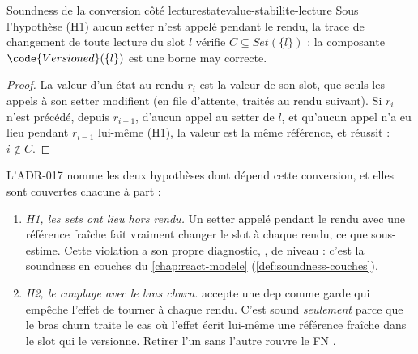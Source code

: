 \begin{proposition}{Soundness de la conversion côté lecture}{statevalue-stabilite-lecture}
  Sous l'hypothèse (H1) \og aucun setter n'est appelé pendant le rendu\fg{},
  la trace de changement de toute lecture du slot $l$ vérifie $C \subseteq
  \mathit{Set}(\{l\})$ : la composante $\code{Versioned}(\{l\})$ est une
  borne may correcte.
\end{proposition}
\begin{proof}
  La valeur d'un état au rendu $r_i$ est la valeur de son slot, que seuls
  les appels à son setter modifient (en file d'attente, traités au rendu
  suivant). Si $r_i$ n'est précédé, depuis $r_{i-1}$, d'aucun appel au setter
  de $l$, et qu'aucun appel n'a eu lieu pendant $r_{i-1}$ lui-même (H1), la
  valeur est la même référence, et  réussit : $i \notin C$.
\end{proof}

L'ADR-017 nomme les deux hypothèses dont dépend cette conversion, et elles
sont couvertes chacune à part :
\begin{enumerate}
  \item \emph{H1, les sets ont lieu hors rendu.} Un setter appelé pendant le
    rendu avec une référence fraîche fait vraiment changer le slot à chaque
    rendu, ce que  sous-estime. Cette violation a son propre
    diagnostic, , de niveau \Error{} : c'est la
    soundness en couches du \cref{chap:react-modele}
    (\cref{def:soundness-couches}).
  \item \emph{H2, le couplage avec le bras churn.} 
    accepte une dep  comme \og garde\fg{} qui empêche
    l'effet de tourner à chaque rendu. C'est sound \emph{seulement} parce
    que le bras churn traite le cas où l'effet écrit lui-même une référence
    fraîche dans le slot qui le versionne. Retirer l'un sans l'autre rouvre
    le FN .
\end{enumerate}

